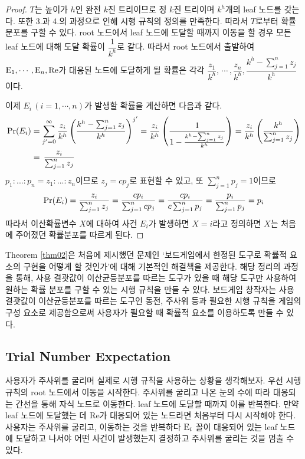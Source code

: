 \documentclass[11pt]{article}
\begin{document}
\begin{proof}
$T$는 높이가 $h$인 완전 $k$진 트리이므로 정 $k$진 트리이며 $k^{h}$개의 leaf 노드를 갖는다. 또한 3.과 4.의 과정으로 인해 시행 규칙의 정의를 만족한다. 따라서 $T$로부터 확률분포를 구할 수 있다. root 노드에서 leaf 노드에 도달할 때까지 이동을 할 경우 모든 leaf 노드에 대해 도달 확률이 $\dfrac{1}{k^{h}}$로 같다. 따라서 root 노드에서 출발하여 $\textnormal{E}_1,\cdots,\textnormal{E}_n,\textnormal{Re}$가 대응된 노드에 도달하게 될 확률은 각각 $\dfrac{z_{1}}{k^{h}},\,\cdots\,,\dfrac{z_{n}}{k^{h}},\dfrac{k^{h}-\sum_{j=1}^{n}z_{j}}{k^{h}}$이다.

이제 $E_{i}\,(i=1,\cdots,n)$가 발생할 확률을 계산하면 다음과 같다.
\[
\begin{split}
\textnormal{Pr}(E_{i}) & = \sum_{j'=0}^{\infty} \frac{z_{i}}{k^{h}}\left(\frac{k^{h}-\sum_{j=1}^{n}z_{j}}{k^{h}}\right)^{j'} = \frac{z_{i}}{k^{h}}\left(\frac{1}{1 - \frac{k^{h}-\sum_{j=1}^{n}z_{j}}{k^{h}}}\right) = \frac{z_{i}}{k^{h}}\left(\frac{k^{h}}{\sum_{j=1}^{n}z_{j}}\right)\\
& = \,\frac{z_{i}}{\sum_{j=1}^{n}z_{j}}
\end{split}
\]
$p_{1}:...:p_{n} = z_{1}:...:z_{n}$이므로 $z_{j} = cp_{j}$로 표현할 수 있고, 또 $\sum_{j=1}^{n}p_{j} = 1$이므로
\[\textnormal{Pr}(E_{i}) = \frac{z_{i}}{\sum_{j=1}^{n}z_{j}} = \frac{cp_{i}}{\sum_{j=1}^{n}cp_{j}} = \frac{cp_{i}}{c\sum_{j=1}^{n}p_{j}} = \frac{p_{i}}{\sum_{j=1}^{n}p_{j}} = p_{i}\]
따라서 이산확률변수 $X$에 대하여 사건 $E_{i}$가 발생하면 $X = i$라고 정의하면 $X$는 처음에 주어졌던 확률분포를 따르게 된다.
\end{proof}

Theorem \ref{thm02}은 처음에 제시했던 문제인 `보드게임에서 한정된 도구로 확률적 요소의 구현을 어떻게 할 것인가'에 대해 기본적인 해결책을 제공한다. 해당 정리의 과정을 통해, 사용 결괏값이 이산균등분포를 따르는 도구가 있을 때 해당 도구만 사용하여 원하는 확률 분포를 구할 수 있는 시행 규칙을 만들 수 있다. 보드게임 창작자는 사용 결괏값이 이산균등분포를 따르는 도구인 동전, 주사위 등과 필요한 시행 규칙을 게임의 구성 요소로 제공함으로써 사용자가 필요할 때 확률적 요소를 이용하도록 만들 수 있다.

\subsection{Trial Number Expectation} \label{subsection3-3}
사용자가 주사위를 굴리며 실제로 시행 규칙을 사용하는 상황을 생각해보자. 우선 시행 규칙의 root 노드에서 이동을 시작한다. 주사위를 굴리고 나온 눈의 수에 따라 대응되는 간선을 통해 자식 노드로 이동한다. leaf 노드에 도달할 때까지 이를 반복한다. 만약 leaf 노드에 도달했는 데 Re가 대응되어 있는 노드라면 처음부터 다시 시작해야 한다. 사용자는 주사위를 굴리고, 이동하는 것을 반복하다 $\textnormal{E}_{i}$ 꼴이 대응되어 있는 leaf 노드에 도달하고 나서야 어떤 사건이 발생했는지 결정하고 주사위를 굴리는 것을 멈출 수 있다. 
\end{document}
